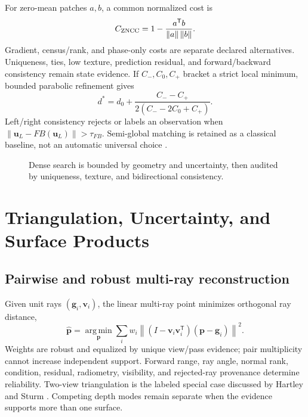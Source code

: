 \documentclass[journal]{IEEEtran}
\newcommand{\T}{^{\mathsf T}}
\newcommand{\norm}[1]{\left\lVert #1\right\rVert}
\newcommand{\argmin}{\operatorname*{arg\,min}}
\begin{document}
For zero-mean patches $a,b$, a common normalized cost is
\begin{equation}
C_{\rm ZNCC}=1-\frac{a\T b}{\norm{a}\norm{b}}.
\label{eq:zncc}
\end{equation}
Gradient, census/rank, and phase-only costs are separate declared alternatives.
Uniqueness, ties, low texture, prediction residual, and forward/backward
consistency remain state evidence. If $C_{-},C_0,C_{+}$ bracket a strict local
minimum, bounded parabolic refinement gives
\begin{equation}
d^*=d_0+\frac{C_{-}-C_{+}}
{2(C_{-}-2C_0+C_{+})}.
\label{eq:subpixel}
\end{equation}
Left/right consistency rejects or labels an observation when
$\norm{\bm u_L-FB(\bm u_L)}>\tau_{FB}$. Semi-global matching is retained as a
classical baseline, not an automatic universal choice
\cite{Hirschmuller2008,ScharsteinSzeliski2002}.

\begin{figure}[t]
\centering
{}
\caption{Dense search is bounded by geometry and uncertainty, then audited by
uniqueness, texture, and bidirectional consistency.}
\label{fig:dense}
\end{figure}

\section{Triangulation, Uncertainty, and Surface Products}

\subsection{Pairwise and robust multi-ray reconstruction}

Given unit rays $(\bm g_i,\bm v_i)$, the linear multi-ray point minimizes
orthogonal ray distance,
\begin{equation}
\widehat{\bm p}=\argmin_{\bm p}
\sum_i w_i\norm{(I-\bm v_i\bm v_i\T)(\bm p-\bm g_i)}^2.
\label{eq:multiray}
\end{equation}
Weights are robust and equalized by unique view/pass evidence; pair
multiplicity cannot increase independent support. Forward range, ray angle,
normal rank, condition, residual, radiometry, visibility, and rejected-ray
provenance determine reliability. Two-view triangulation is the labeled special
case discussed by Hartley and Sturm \cite{HartleySturm1997}. Competing depth
modes remain separate when the evidence supports more than one surface.
\end{document}
